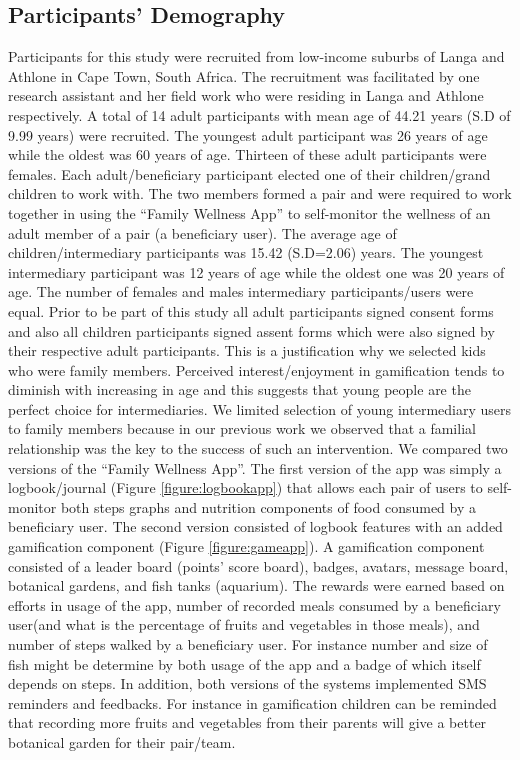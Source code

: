 \documentclass{sig-alternate}
\begin{document}
\subsection{Participants' Demography}
Participants for this study were recruited from low-income suburbs of Langa and Athlone in Cape Town, South Africa. The recruitment was facilitated by one research assistant and her field work who were residing in Langa and Athlone respectively.\newline
A total of 14 adult participants with mean age of 44.21 years (S.D of 9.99 years) were recruited. The youngest adult participant was 26 years of age while the oldest was 60 years of age. Thirteen of these adult participants were females. Each adult/beneficiary participant  elected one of their children/grand children to work with. The two members formed a pair and were required to work together in using the ``Family Wellness App'' to self-monitor the wellness of an adult member of a pair (a beneficiary user). The average age of children/intermediary participants was 15.42 (S.D=2.06) years. The youngest intermediary participant was 12 years of age while the oldest one was 20 years of age. The number of females and males intermediary participants/users were equal. Prior to be part of this study all adult participants signed consent forms and also all children participants signed assent forms which were also signed by their respective adult participants. This is a justification why we selected kids who were family members. Perceived interest/enjoyment in gamification tends to diminish with increasing in age \cite{v2014motivational} and this suggests that young people are the perfect choice for intermediaries. We limited selection of young intermediary users to family members because in our previous work we observed that a familial relationship was the key to the success of such an intervention.\newline
We compared two versions of the ``Family Wellness App''. The first version of the app was simply a logbook/journal (Figure \ref{figure:logbookapp}) that allows each pair of users to self-monitor both steps graphs and nutrition components of food consumed by a beneficiary user. The second version consisted of logbook features with an added gamification component (Figure \ref{figure:gameapp}). A gamification component consisted of a leader board (points' score board), badges, avatars, message board, botanical gardens, and fish tanks (aquarium). The rewards were earned based on efforts in usage of the app, number of recorded meals consumed by a beneficiary user(and what is the percentage of fruits and vegetables in those meals), and number of steps walked by a beneficiary user. For instance  number and size of fish might be determine by both usage of the app and a badge of which itself depends on steps.  In addition, both versions of the systems implemented SMS reminders and feedbacks. For instance in gamification children can be reminded that recording more fruits and vegetables from their parents will give a better botanical garden for their pair/team.\newline 
\end{document}
